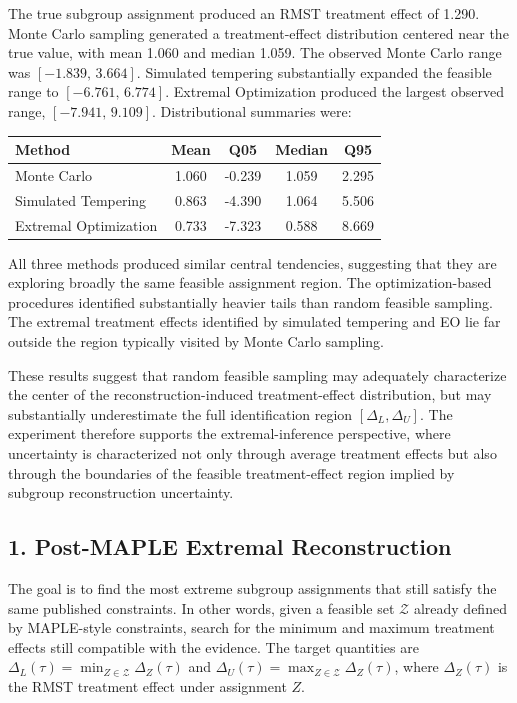 \documentclass[11pt]{article}
\begin{document}
The true subgroup assignment produced an RMST treatment effect of 1.290.
Monte Carlo sampling generated a treatment-effect distribution centered near the true value, with mean 1.060 and median 1.059. The observed Monte Carlo range was \([-1.839,\,3.664]\).
Simulated tempering substantially expanded the feasible range to \([-6.761,\,6.774]\).
Extremal Optimization produced the largest observed range, \([-7.941,\,9.109]\).
Distributional summaries were:
\begin{center}
\begin{tabular}{lcccc}
Method & Mean & Q05 & Median & Q95 \\
\hline
Monte Carlo & 1.060 & -0.239 & 1.059 & 2.295 \\
Simulated Tempering & 0.863 & -4.390 & 1.064 & 5.506 \\
Extremal Optimization & 0.733 & -7.323 & 0.588 & 8.669
\end{tabular}
\end{center}
All three methods produced similar central tendencies, suggesting that they are exploring broadly the same feasible assignment region.
The optimization-based procedures identified substantially heavier tails than random feasible sampling.
The extremal treatment effects identified by simulated tempering and EO lie far outside the region typically visited by Monte Carlo sampling.

These results suggest that random feasible sampling may adequately characterize the center of the reconstruction-induced treatment-effect distribution, but may substantially underestimate the full identification region \([\Delta_L,\Delta_U]\).
The experiment therefore supports the extremal-inference perspective, where uncertainty is characterized not only through average treatment effects but also through the boundaries of the feasible treatment-effect region implied by subgroup reconstruction uncertainty.

\subsection*{1. Post-MAPLE Extremal Reconstruction}

The goal is to find the most extreme subgroup assignments that still satisfy the same published constraints. In other words, given a feasible set \(\mathcal Z\) already defined by MAPLE-style constraints, search for the minimum and maximum treatment effects still compatible with the evidence.
The target quantities are \(\Delta_L(\tau)=\min_{Z\in\mathcal Z}\Delta_Z(\tau)\) and \(\Delta_U(\tau)=\max_{Z\in\mathcal Z}\Delta_Z(\tau)\), where \(\Delta_Z(\tau)\) is the RMST treatment effect under assignment \(Z\).
\end{document}
